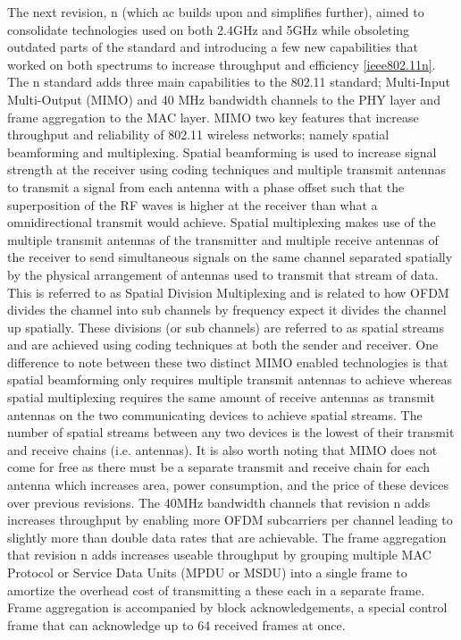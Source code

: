 The next revision, n (which ac builds upon and simplifies further), aimed to consolidate technologies used on both 2.4GHz and 5GHz while obsoleting outdated parts of the standard and introducing a few new capabilities that worked on both spectrums to increase throughput and efficiency \ref{ieee802.11n}. The n standard adds three main capabilities to the 802.11 standard; Multi-Input Multi-Output (MIMO) and 40 MHz bandwidth channels to the PHY layer and frame aggregation to the MAC layer. MIMO two key features that increase throughput and reliability of 802.11 wireless networks; namely spatial beamforming and multiplexing. Spatial beamforming is used to increase signal strength at the receiver using coding techniques and multiple transmit antennas to transmit a signal from each antenna with a phase offset such that the superposition of the RF waves is higher at the receiver than what a omnidirectional transmit would achieve. Spatial multiplexing makes use of the multiple transmit antennas of the transmitter and multiple receive antennas of the receiver to send  simultaneous signals on the same channel separated spatially by the physical arrangement of antennas used to transmit that stream of data. This is referred to as Spatial Division Multiplexing and is related to how OFDM divides the channel into sub channels by frequency expect it divides the channel up spatially. These divisions (or sub channels) are referred to as spatial streams and are achieved using coding techniques at both the sender and receiver. One difference to note between these two distinct MIMO enabled technologies is that spatial beamforming only requires multiple transmit antennas to achieve whereas spatial multiplexing requires the same amount of receive antennas as transmit antennas on the two communicating devices to achieve spatial streams. The number of spatial streams between any two devices is the lowest of their transmit and receive chains (i.e. antennas). It is also worth noting that MIMO does not come for free as there must be a separate transmit and receive chain for each antenna which increases area, power consumption, and the price of these devices over previous revisions. The 40MHz bandwidth channels that revision n adds increases throughput by enabling more OFDM subcarriers per channel leading to slightly more than double data rates that are achievable. The frame aggregation that revision n adds increases useable throughput by grouping multiple MAC Protocol or Service Data Units (MPDU or MSDU) into a single frame to amortize the overhead cost of transmitting a these each in a separate frame. Frame aggregation is accompanied by block acknowledgements, a special control frame that can acknowledge up to 64 received frames at once. 

